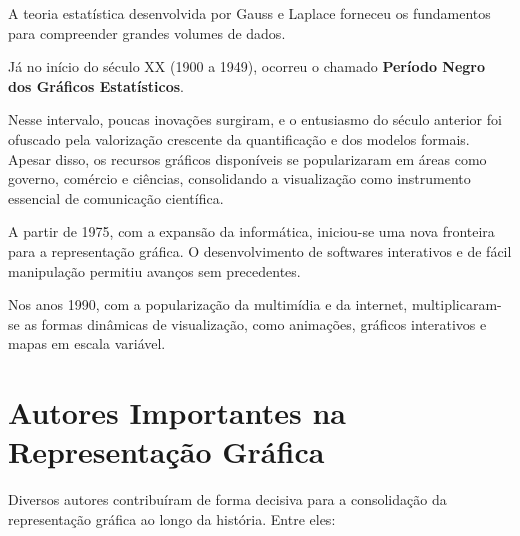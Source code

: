 A teoria estatística desenvolvida por Gauss e Laplace forneceu os fundamentos para compreender grandes volumes de dados.  
\vskip0.3cm 

Já no início do século XX (1900 a 1949), ocorreu o chamado \textbf{Período Negro dos Gráficos Estatísticos}. 

\newpage
Nesse intervalo, poucas inovações surgiram, e o entusiasmo do século anterior foi ofuscado pela valorização crescente da quantificação e dos modelos formais. Apesar disso, os recursos gráficos disponíveis se popularizaram em áreas como governo, comércio e ciências, consolidando a visualização como instrumento essencial de comunicação científica.\vskip0.3cm 

A partir de 1975, com a expansão da informática, iniciou-se uma nova fronteira para a representação gráfica. O desenvolvimento de softwares interativos e de fácil manipulação permitiu avanços sem precedentes. \vskip0.3cm 


Nos anos 1990, com a popularização da multimídia e da internet, multiplicaram-se as formas dinâmicas de visualização, como animações, gráficos interativos e mapas em escala variável.\vskip0.3cm  


\section{Autores Importantes na Representação Gráfica}

Diversos autores contribuíram de forma decisiva para a consolidação da representação gráfica ao longo da história. Entre eles:


